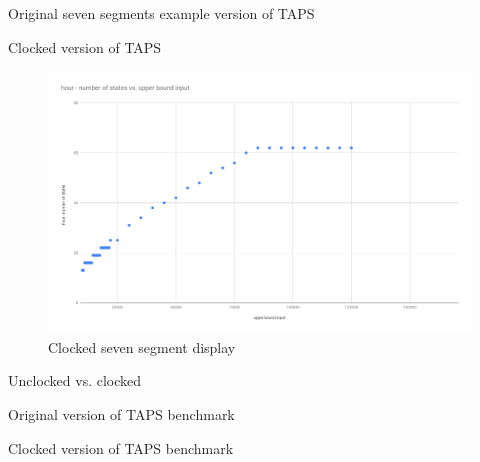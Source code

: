 \documentclass[11pt]{beamer}
\begin{document}
%

\begin{frame}{Original seven segments example version of TAPS}
\end{frame}

\begin{frame}{Clocked version of TAPS}
          \begin{figure}[!ht]
               \centering
               \includegraphics[scale=0.2]{figures/clocked_new_states.png}
               \caption{Clocked seven segment display}
          \end{figure}
\end{frame}

\begin{frame}{Unclocked vs. clocked}
\end{frame}

\begin{frame}{Original version of TAPS benchmark}
\end{frame}

\begin{frame}{Clocked version of TAPS benchmark}
\end{frame}
\end{document}
